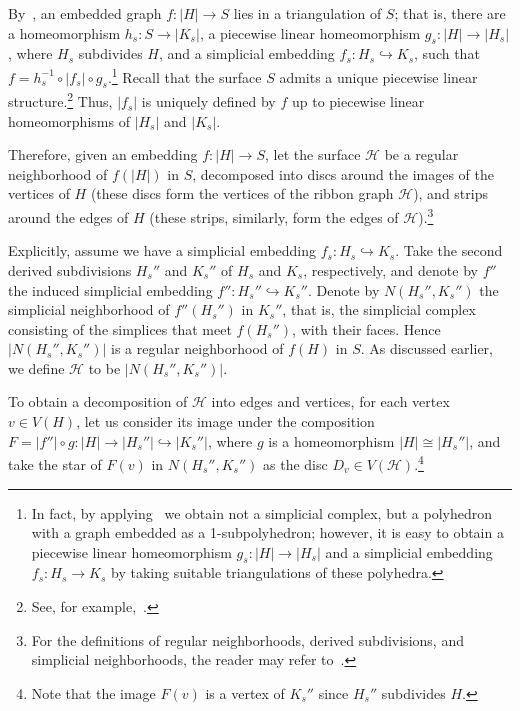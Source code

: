 \documentclass[a4paper,12pt,reqno,oneside]{amsart}
\theoremstyle{plain}
\theoremstyle{definition}
\theoremstyle{plain}
\newcommand{\from}{\colon}
\newcommand{\HH}{\mathcal{H}}
\begin{document}
By~\cite[Theorem 1.3]{hoffman_embedding}, an embedded graph $f \from |H| \to S$ lies in a
triangulation of $S$; that is, there are a homeomorphism $h_s \from S \to |K_s|$, a piecewise linear
homeomorphism $g_s \from |H| \to |H_s|$, where $H_s$ subdivides $H$, and a simplicial embedding
$f_s \from H_s \hookrightarrow K_s$, such that $f = h_s^{-1} \circ |f_s| \circ g_{s}$.\footnote{In fact,
  by applying~\cite[Theorem 1.3]{hoffman_embedding} we obtain not a simplicial complex, but a
  polyhedron with a graph embedded as a 1-subpolyhedron; however, it is easy to obtain a piecewise
  linear homeomorphism $g_s \from |H| \to |H_s|$ and a simplicial embedding $f_s \from H_s \to K_s$
  by taking suitable triangulations of these polyhedra.} Recall that the surface $S$ admits a unique
piecewise linear structure.\footnote{{See, for example,~\cite[Theorem 5, Chapter
    8]{moise}.}} Thus, $|f_s|$ is uniquely defined by $f$ up to piecewise linear
homeomorphisms of $|H_s|$ and $|K_s|$.

Therefore, given an embedding $f \from |H| \to S$, let the surface $\HH$ be a regular neighborhood
of $f(|H|)$ in $S$, decomposed into discs around the images of the vertices of $H$ (these discs form
the vertices of the ribbon graph $\HH$), and strips around the edges of $H$ (these strips,
similarly, form the edges of $\HH$).\footnote{{For the definitions of regular neighborhoods, derived
    subdivisions, and simplicial neighborhoods, the reader may refer to~\cite{rourke_sanderson}.}}

Explicitly, assume we have a simplicial embedding $f_s \from H_s \hookrightarrow K_s$. Take the
second derived subdivisions $H_s''$ and $K_s''$ of $H_s$ and $K_s$, respectively, and denote by
$f''$ the induced simplicial embedding $f'' \from H_s'' \hookrightarrow K_s''$. Denote by
$N(H_s'', K_s'')$ the simplicial neighborhood of $f''(H_s'')$ in $K_s''$, that is, the simplicial
complex consisting of the simplices that meet $f(H_s'')$, with their faces. Hence
$|N(H_s'', K_s'')|$ is a regular neighborhood of $f(H)$ in $S$. As discussed earlier, we define
$\HH$ to be $|N(H_s'', K_s'')|$.

To obtain a decomposition of $\HH$ into edges and vertices, for each vertex $v \in V(H)$, let us
consider its image under the composition
$F = |f''| \circ g \from |H| \to |H_s''| \hookrightarrow |K_s''|$, where $g$ is a homeomorphism
$|H| \cong |H_s''|$, and take the star of $F(v)$ in $N(H_s'', K_s'')$ as the disc
$D_v \in V(\HH)$.\footnote{Note that the image $F(v)$ is a vertex of $K_s''$ since $H_s''$
  subdivides $H$.}
\end{document}
